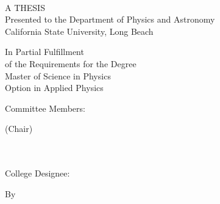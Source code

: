 \begin{titlepage}
    \begin{center}
        \linespread{2}
        \normalsize
        \textbf{ \cThesisTitle }\\
        \medskip
    \end{center}
    \begin{center}
        \linespread{1}
        \vfill

        		A THESIS \\
		Presented to the Department of Physics and Astronomy\\
        		California State University, Long Beach
        \vfill
        
        In Partial Fulfillment\\
        of the Requirements for the Degree\\
        Master of Science in Physics\\
        Option in Applied Physics
        \vfill
        
        Committee Members:\\
        \bigskip
        \begin{singlespaced}
       		\cCommitteeA (Chair)\\
        		\cCommitteeB \\
        		\cCommitteeC \\
        \end{singlespaced}
        \vfill
        
        College Designee:\\
        \cDeptChair
        \vfill
        
        By \cAuthorName\\
        \bigskip
        \cLastDegree \\
       
        \bigskip
		\cGraduationDate
    \end{center}
\end{titlepage}